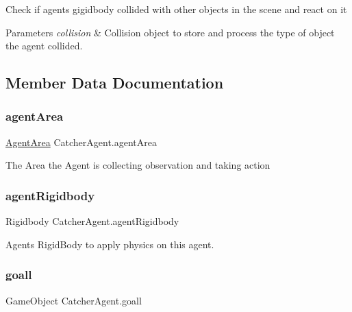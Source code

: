 Check if agents gigidbody collided with other objects in the scene and react on it 


\begin{DoxyParams}{Parameters}
{\em collision} & Collision object to store and process the type of object the agent collided.\\
\hline
\end{DoxyParams}


\subsection{Member Data Documentation}
\mbox{\label{class_catcher_agent_a92d790163f19c9d8ba3fb5655be02575}} 
\subsubsection{\texorpdfstring{agentArea}{agentArea}}
{\footnotesize\ttfamily \mbox{\hyperlink{class_agent_area}{Agent\+Area}} Catcher\+Agent.\+agent\+Area\hspace{0.3cm}{\ttfamily [private]}}



The Area the Agent is collecting observation and taking action 

\mbox{\label{class_catcher_agent_a2e5c259c9930c0d93aac6b64177c95c1}} 
\subsubsection{\texorpdfstring{agentRigidbody}{agentRigidbody}}
{\footnotesize\ttfamily Rigidbody Catcher\+Agent.\+agent\+Rigidbody\hspace{0.3cm}{\ttfamily [private]}}



Agents Rigid\+Body to apply physics on this agent. 

\mbox{\label{class_catcher_agent_a5158fa0d75280a5131037cd20d7e3afd}} 
\subsubsection{\texorpdfstring{goall}{goall}}
{\footnotesize\ttfamily Game\+Object Catcher\+Agent.\+goall}



